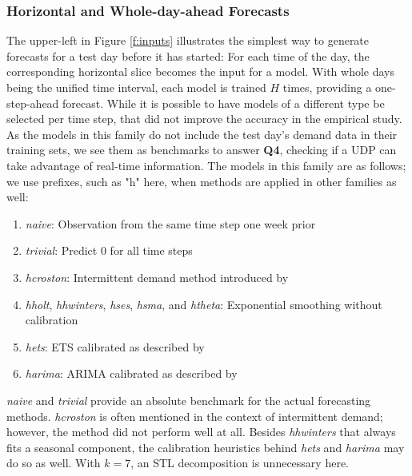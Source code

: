 \subsubsection{Horizontal and Whole-day-ahead Forecasts}
\label{hori}

The upper-left in Figure \ref{f:inputs} illustrates the simplest way to
    generate forecasts for a test day before it has started:
For each time of the day, the corresponding horizontal slice becomes the input
    for a model.
With whole days being the unified time interval, each model is trained $H$
    times, providing a one-step-ahead forecast.
While it is possible to have models of a different type be selected per time
    step, that did not improve the accuracy in the empirical study.
As the models in this family do not include the test day's demand data in
    their training sets, we see them as benchmarks to answer \textbf{Q4},
    checking if a UDP can take advantage of real-time information.
The models in this family are as follows; we use prefixes, such as "h" here,
    when methods are applied in other families as well:
\begin{enumerate}
\item \textit{\gls{naive}}:
          Observation from the same time step one week prior
\item \textit{\gls{trivial}}:
          Predict $0$ for all time steps
\item \textit{\gls{hcroston}}:
          Intermittent demand method introduced by \cite{croston1972}
\item \textit{\gls{hholt}},
      \textit{\gls{hhwinters}},
      \textit{\gls{hses}},
      \textit{\gls{hsma}}, and
      \textit{\gls{htheta}}:
          Exponential smoothing without calibration
\item \textit{\gls{hets}}:
          ETS calibrated as described by \cite{hyndman2008b}
\item \textit{\gls{harima}}:
          ARIMA calibrated as described by \cite{hyndman2008a}
\end{enumerate}
\textit{naive} and \textit{trivial} provide an absolute benchmark for the
    actual forecasting methods.
\textit{hcroston} is often mentioned in the context of intermittent demand;
    however, the method did not perform well at all.
Besides \textit{hhwinters} that always fits a seasonal component, the
    calibration heuristics behind \textit{hets} and \textit{harima} may do so
    as well.
With $k=7$, an STL decomposition is unnecessary here.
